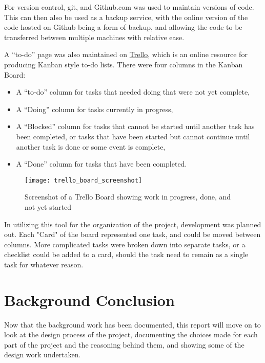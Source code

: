 For version control, git, and Github.com was used to maintain versions of code. This can then also be used as a backup service, with the online version of the code hosted on Github being a form of backup, and allowing the code to be transferred between multiple machines with relative ease.

 A “to-do” page was also maintained on \href{https://trello.com}{Trello}, which is an online resource for producing Kanban style to-do lists. There were four columns in the Kanban Board: 
\begin{itemize}
	\item A “to-do” column for tasks that needed doing that were not yet complete, 
	\item A  “Doing” column for tasks currently in progress, 
	\item A “Blocked” column for tasks that cannot be started until another task has been completed, or tasks that have been started but cannot continue until another task is done or some event is complete,
	\item A “Done” column for tasks that have been completed.
\end{itemize}

\begin{figure}[ht]
	\texttt{[image: trello\_board\_screenshot]}
	\caption{Screenshot of a Trello Board showing work in progress, done, and not yet started}
	\label{fig:trello_screenshot}
\end{figure}

In utilizing this tool for the organization of the project, development was planned out. Each "Card" of the board represented one task, and could be moved between columns. More complicated tasks were broken down into separate tasks, or a checklist could be added to a card, should the task need to remain as a single task for whatever reason.

\section{Background Conclusion}
Now that the background work has been documented, this report will move on to look at the design process of the project, documenting the choices made for each part of the project and the reasoning behind them, and showing some of the design work undertaken.